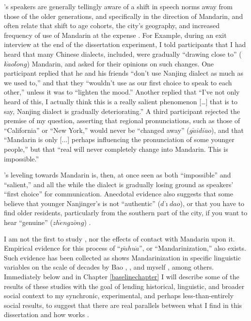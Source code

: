     \ND{}'s speakers are generally tellingly aware of a shift in speech norms away from those of the older generations, and specifically in the direction of Mandarin, and often relate that shift to age cohorts, the city's geography, and increased frequency of use of Mandarin at the expense \ND{}. For Example, during an exit interview at the end of the dissertation experiment, I told participants that I had heard that many Chinese dialects, \ND{} included, were gradually ``drawing close to'' ($k\grave{a}ol\check{o}ng$) Mandarin, and asked for their opinions on such changes. One participant replied that he and his friends ``don't use Nanjing dialect as much as we used to,'' and that they ``wouldn't use \ND{} as our first choice to speak to each other,'' unless it was to ``lighten the mood.'' Another replied that ``I've not only heard of this, I actually think this is a really salient phenomenon [\ldots{}] that is to say, Nanjing dialect is gradually deteriorating.'' A third participant rejected the premise of my question, asserting that regional pronunciations, such as those of ``California'' or ``New York,'' would never be ``changed away'' ($g\check{a}idi\grave{a}o$), and that ``Mandarin is only [...] perhaps influencing the pronunciation of some younger people,'' but that ``real \ND{} will never completely change into Mandarin. This is impossible.''
    
    \ND{}'s leveling towards Mandarin is, then, at once seen as both ``impossible'' and ``salient,'' and all the while the dialect is gradually losing ground as speakers' ``first choice'' for communication. Anecdotal evidence also suggests that some believe that younger Nanjinger's \ND{} is not ``authentic'' ($d\grave{\imath}dao$), or that you have to find older residents, particularly from the southern part of the city, if you want to hear ``genuine'' ($zh\grave{e}ngz\bar{o}ng$) \ND{}.
    
    I am not the first to study \ND{}, nor the effects of contact with Mandarin upon it. Empirical evidence for this process of ``$p\check{u}hu\grave{a}$'', or ``Mandarinization,'' also exists. Such evidence has been collected as shows Mandarinization in specific linguistic variables on the scale of decades by Bao \citeyearpar[orig. 1980]{bao1980sixty}, \cite{chen2011differences}, and myself \citeyearpar{coles2017mandarinization}, among others. Immediately below and in Chapter \ref{baselinechapter} I will describe some of the results of these studies with the goal of lending historical, linguistic, and broader social context to my synchronic, experimental, and perhaps less-than-entirely social results, to suggest that there are real parallels between what I find in this dissertation and how \cidc{} works \IRL{}.
    
